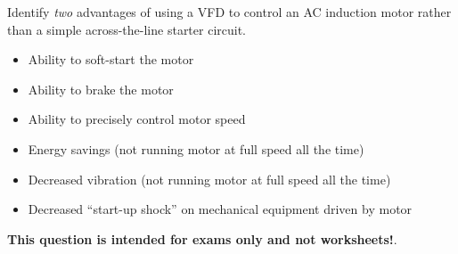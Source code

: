 

Identify {\it two} advantages of using a VFD to control an AC induction motor rather than a simple across-the-line starter circuit.

\vskip 100pt







\begin{itemize}
\item{} Ability to soft-start the motor
\item{} Ability to brake the motor
\item{} Ability to precisely control motor speed
\item{} Energy savings (not running motor at full speed all the time)
\item{} Decreased vibration (not running motor at full speed all the time)
\item{} Decreased ``start-up shock'' on mechanical equipment driven by motor
\end{itemize}







{\bf This question is intended for exams only and not worksheets!}.


